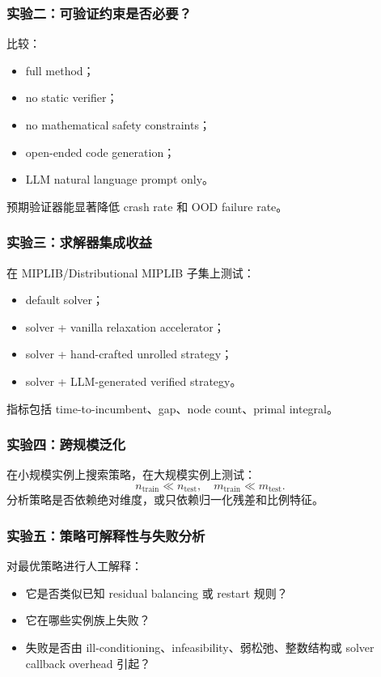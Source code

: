 \documentclass[UTF8,a4paper,12pt,fontset=fandol]{ctexart}
\begin{document}
\subsubsection{实验二：可验证约束是否必要？}

比较：
\begin{itemize}[leftmargin=2em]
    \item full method；
    \item no static verifier；
    \item no mathematical safety constraints；
    \item open-ended code generation；
    \item LLM natural language prompt only。
\end{itemize}
预期验证器能显著降低 crash rate 和 OOD failure rate。

\subsubsection{实验三：求解器集成收益}

在 MIPLIB/Distributional MIPLIB 子集上测试：
\begin{itemize}[leftmargin=2em]
    \item default solver；
    \item solver + vanilla relaxation accelerator；
    \item solver + hand-crafted unrolled strategy；
    \item solver + LLM-generated verified strategy。
\end{itemize}
指标包括 time-to-incumbent、gap、node count、primal integral。

\subsubsection{实验四：跨规模泛化}

在小规模实例上搜索策略，在大规模实例上测试：
\begin{equation}
n_{\text{train}} \ll n_{\text{test}}, \quad m_{\text{train}} \ll m_{\text{test}}.
\end{equation}
分析策略是否依赖绝对维度，或只依赖归一化残差和比例特征。

\subsubsection{实验五：策略可解释性与失败分析}

对最优策略进行人工解释：
\begin{itemize}[leftmargin=2em]
    \item 它是否类似已知 residual balancing 或 restart 规则？
    \item 它在哪些实例族上失败？
    \item 失败是否由 ill-conditioning、infeasibility、弱松弛、整数结构或 solver callback overhead 引起？
\end{itemize}
\end{document}
